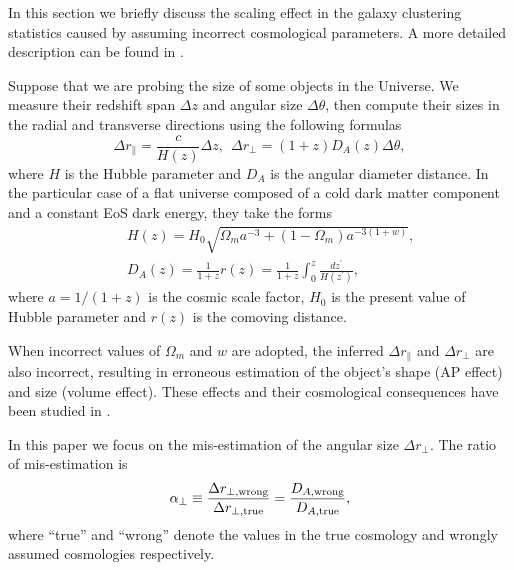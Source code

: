 \documentclass[iop]{emulateapj}
\begin{document}
In this section we briefly discuss the scaling effect in the galaxy clustering statistics caused by assuming incorrect cosmological parameters. A more detailed description can be found in \cite{Li2014,Li2015,Li2016}.

Suppose that we are probing the size of some objects in the Universe.
We measure their redshift span $\Delta z$ and angular size $\Delta \theta$,
then compute their sizes in the radial and transverse directions using the following formulas
\begin{equation}\label{eq:distance}
\Delta r_{\parallel} = \frac{c}{H(z)}\Delta z,\ \ \Delta r_{\perp}=(1+z)D_A(z)\Delta \theta,
\end{equation}
where $H$ is the Hubble parameter and $D_A$ is the angular diameter distance.
In the particular case of a flat universe composed of a cold dark matter component and a constant EoS dark energy, they take the forms
\begin{eqnarray}\label{eq:HDA}
& &H(z) = H_0\sqrt{\Omega_ma^{-3}+(1-\Omega_m)a^{-3(1+w)}},\nonumber\\
& &D_A(z) = \frac{1}{1+z}r(z)=\frac{1}{1+z}\int_0^z \frac{dz^\prime}{H(z^\prime)},
\end{eqnarray}
where $a=1/(1+z)$ is the cosmic scale factor,
$H_0$ is the present value of Hubble parameter and $r(z)$ is the comoving distance.

When incorrect values of $\Omega_m$ and $w$ are adopted, 
the inferred $\Delta r_{\parallel}$ and $\Delta r_{\perp}$ are also incorrect,
resulting in erroneous estimation of the object's shape (AP effect) and size (volume effect).
These effects and their cosmological consequences have been studied in \cite{Li2014,Li2015,Li2016}.

In this paper we focus on the mis-estimation of the angular size $\Delta r_{\perp}$. %
The ratio of mis-estimation is
\begin{equation}\label{eq:DA}
 \alpha_{\perp} \equiv \frac{\Delta r_{\perp, \rm wrong}}{\Delta r_{\perp, \rm true}}
 = \frac{D_{A, \rm wrong}}{D_{A, \rm true}},
\end{equation}
where ``true'' and ``wrong'' denote the values in the true cosmology and wrongly assumed cosmologies respectively.
\end{document}
